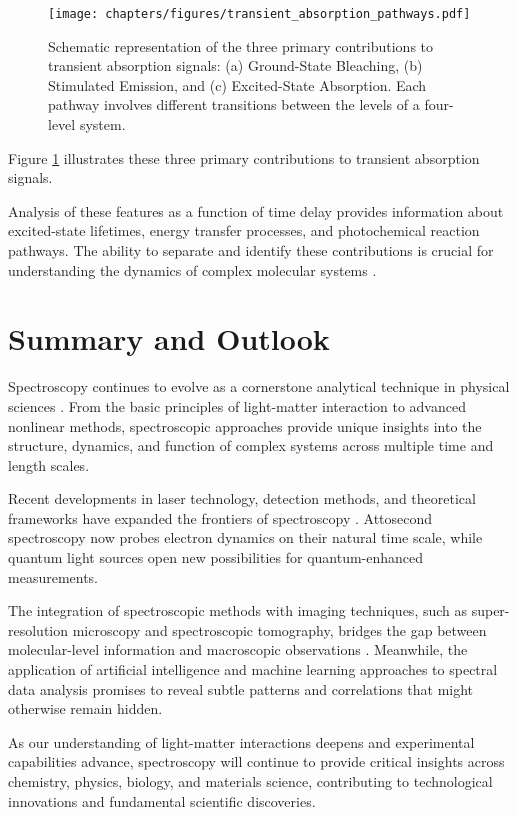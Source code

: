 \begin{figure}[ht]
    \centering
    \texttt{[image: chapters/figures/transient\_absorption\_pathways.pdf]}
    \caption{Schematic representation of the three primary contributions to transient absorption signals: (a) Ground-State Bleaching, (b) Stimulated Emission, and (c) Excited-State Absorption. Each pathway involves different transitions between the levels of a four-level system.}
    \label{fig:transient_absorption_pathways}
\end{figure}

\noindent Figure \ref{fig:transient_absorption_pathways} illustrates these three primary contributions to transient absorption signals.

\noindent Analysis of these features as a function of time delay provides information about excited-state lifetimes, energy transfer processes, and photochemical reaction pathways. The ability to separate and identify these contributions is crucial for understanding the dynamics of complex molecular systems \cite{Berera2009, Megerle2009}.


\section{Summary and Outlook}
\label{sec:summary}

\noindent Spectroscopy continues to evolve as a cornerstone analytical technique in physical sciences \cite{Mukamel1995, Cho2009}. From the basic principles of light-matter interaction to advanced nonlinear methods, spectroscopic approaches provide unique insights into the structure, dynamics, and function of complex systems across multiple time and length scales.

\noindent Recent developments in laser technology, detection methods, and theoretical frameworks have expanded the frontiers of spectroscopy \cite{Jonas2003, Shim2006}. Attosecond spectroscopy now probes electron dynamics on their natural time scale, while quantum light sources open new possibilities for quantum-enhanced measurements.

\noindent The integration of spectroscopic methods with imaging techniques, such as super-resolution microscopy and spectroscopic tomography, bridges the gap between molecular-level information and macroscopic observations \cite{Brixner2005}. Meanwhile, the application of artificial intelligence and machine learning approaches to spectral data analysis promises to reveal subtle patterns and correlations that might otherwise remain hidden.

\noindent As our understanding of light-matter interactions deepens and experimental capabilities advance, spectroscopy will continue to provide critical insights across chemistry, physics, biology, and materials science, contributing to technological innovations and fundamental scientific discoveries.